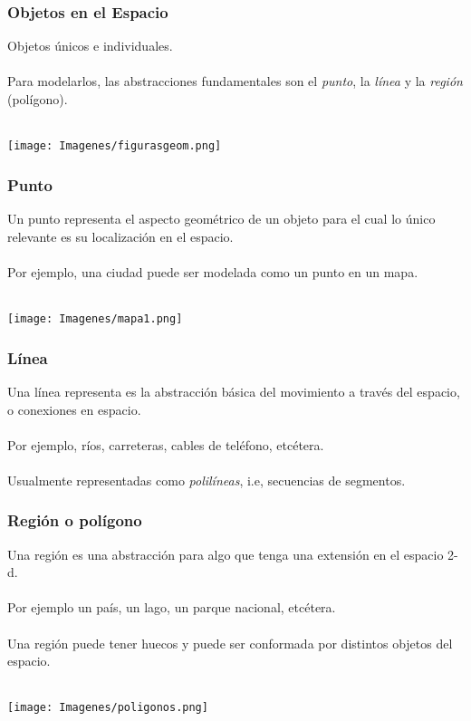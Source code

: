 \documentclass[12pt]{beamer}
\begin{document}

\begin{frame}
\frametitle{Objetos en el Espacio}
Objetos \'unicos e individuales.\\
\ \\
Para modelarlos, las abstracciones fundamentales son el \textit{punto}, la \textit{l\'inea} y la \textit{regi\'on} (pol\'igono).\\
\ \\
\begin{center}\texttt{[image: Imagenes/figurasgeom.png]}
\end{center}

\end{frame}

\begin{frame}
\frametitle{Punto}
Un punto representa el aspecto geom\'etrico de un objeto para el cual lo \'unico relevante es su localizaci\'on en el espacio.\\
\ \\
Por ejemplo, una ciudad puede ser modelada como un punto en un mapa.\\
\ \\
\begin{center}\texttt{[image: Imagenes/mapa1.png]}
\end{center}
\end{frame}

\begin{frame}
\frametitle{L\'inea}
Una l\'inea representa es la abstracci\'on b\'asica del movimiento a trav\'es del espacio, o conexiones en espacio.\\
\ \\
Por ejemplo, r\'ios, carreteras, cables de tel\'efono, etc\'etera.\\
\ \\
Usualmente representadas como \textit{polil\'ineas}, i.e, secuencias de segmentos.
\end{frame}

\begin{frame}
\frametitle{Regi\'on o pol\'igono}
Una regi\'on es una abstracci\'on para algo que tenga una extensi\'on en el espacio 2-d.\\
\ \\
Por ejemplo un pa\'is, un lago, un parque nacional, etc\'etera.\\
\ \\
Una regi\'on puede tener huecos y puede ser conformada por distintos objetos del espacio.\\
\ \\
\begin{center}\texttt{[image: Imagenes/poligonos.png]}
\end{center}
\end{frame}
\end{document}
